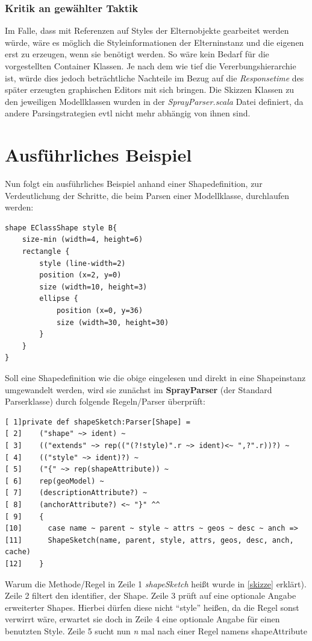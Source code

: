\subsubsection{Kritik an gewählter Taktik}Im Falle, dass mit Referenzen auf Styles der Elternobjekte gearbeitet werden würde, wäre es möglich die Styleinformationen der Elterninstanz und die eigenen erst zu erzeugen, wenn sie benötigt werden. So wäre kein Bedarf für die vorgestellten Container Klassen. Je nach dem wie tief die Vererbungshierarchie ist, würde dies jedoch beträchtliche Nachteile im Bezug auf die \textit{Responsetime} des später erzeugten graphischen Editors mit sich bringen. Die Skizzen Klassen zu den jeweiligen Modellklassen wurden in der \textit{SprayParser.scala} Datei definiert, da andere Parsingstrategien evtl nicht mehr abhängig von ihnen sind.
\section{Ausführliches Beispiel}\label{example}
Nun folgt ein ausführliches Beispiel anhand einer Shapedefinition, zur Verdeutlichung der Schritte, die beim Parsen einer Modellklasse, durchlaufen werden:
\begin{lstlisting}[style=spray]
shape EClassShape style B{
    size-min (width=4, height=6)
    rectangle {
        style (line-width=2)
        position (x=2, y=0)
        size (width=10, height=3)
        ellipse {
            position (x=0, y=36)
            size (width=30, height=30)
        }
    }
}
\end{lstlisting}Soll eine Shapedefinition wie die obige eingelesen und direkt in eine Shapeinstanz umgewandelt werden, wird sie zunächst im \textbf{SprayParser} (der Standard Parserklasse) durch folgende Regeln/Parser überprüft:
\begin{lstlisting}[style=scala]
[ 1]private def shapeSketch:Parser[Shape] =
[ 2]    ("shape" ~> ident) ~
[ 3]    (("extends" ~> rep(("(?!style)".r ~> ident)<~ ",?".r))?) ~
[ 4]    (("style" ~> ident)?) ~
[ 5]    ("{" ~> rep(shapeAttribute)) ~
[ 6]    rep(geoModel) ~
[ 7]    (descriptionAttribute?) ~
[ 8]    (anchorAttribute?) <~ "}" ^^
[ 9]    {
[10]      case name ~ parent ~ style ~ attrs ~ geos ~ desc ~ anch =>
[11]      ShapeSketch(name, parent, style, attrs, geos, desc, anch, cache) 
[12]    }
\end{lstlisting}Warum die Methode/Regel in Zeile 1 \textit{shapeSketch} heißt wurde in \ref{skizze} erklärt). Zeile 2 filtert den identifier, der Shape. Zeile 3 prüft auf eine optionale Angabe erweiterter Shapes. Hierbei dürfen diese nicht "`style"' heißen, da die Regel sonst verwirrt wäre, erwartet sie doch in Zeile 4 eine optionale Angabe für einen benutzten Style. Zeile 5 sucht nun \textit{n} mal nach einer Regel namens shapeAttribute
